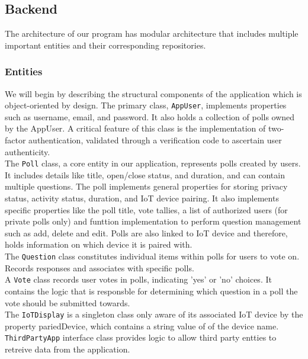 \subsection{Backend}
The architecture of our program has modular architecture that includes multiple important entities and their corresponding repositories.

\subsubsection{Entities}
We will begin by describing the structural components of the application which is object-oriented by design. The primary class, \texttt{AppUser}, implements properties such as username, email, and password. It also holds a collection of polls owned by the AppUser.  A critical feature of this class is the implementation of two-factor authentication, validated through a verification code to ascertain user authenticity. \\

\noindent The \texttt{Poll} class, a core entity in our application, represents polls created by users. It includes details like title, open/close status, and duration, and can contain multiple questions. The poll implements general properties for storing privacy status, activity status, duration, and IoT device pairing. It also implements specific properties like the poll title, vote tallies, a list of authorized users (for private polls only) and funttion implementation to perform question management such as add, delete and edit. Polls are also linked to IoT device and therefore, holds information on which device it is paired with.\\

\noindent The \texttt{Question} class constitutes individual items within polls for users to vote on. Records responses and associates with specific polls.\\

\noindent A \texttt{Vote} class records user votes in polls, indicating 'yes' or 'no' choices. It contains the logic that is responsble for determining which question in a poll the vote should be submitted towards.\\

\noindent The \texttt{IoTDisplay} is a singleton class only aware of its associated IoT device by the property pariedDevice, which contains a string value of of the device name. \\

\noindent \texttt{ThirdPartyApp} interface class provides logic to allow third party entties to retreive data from the application. \\



